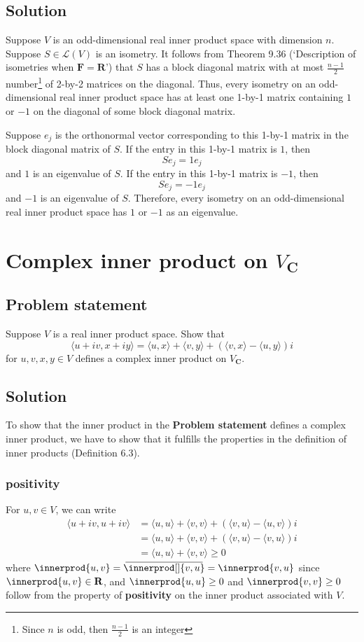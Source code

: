 \documentclass{article}
\DeclarePairedDelimiter{\innerprod}\langle\rangle
\newcommand\conjinnerp[2][]{\:\overline{\mkern-4mu\innerprod[#1]{#2}\mkern-4mu}\:}
\begin{document}
\subsection*{Solution}
Suppose $V$ is an odd-dimensional real inner product space with dimension $n$. 
Suppose $S\in\mathcal{L}(V)$ is an isometry. 
It follows from Theorem 9.36 (`Description of isometries when $\mathbf{F}=\mathbf{R}$') that $S$ has a block diagonal matrix with at most $\frac{n-1}{2}$ number\footnote{
Since $n$ is odd, then $\frac{n-1}{2}$ is an integer
} of 2-by-2 matrices on the diagonal. 
Thus, every isometry on an odd-dimensional real inner product space has at least one 1-by-1 matrix containing $1$ or $-1$ on the diagonal of some block diagonal matrix. 

Suppose $e_j$ is the orthonormal vector corresponding to this 1-by-1 matrix in the block diagonal matrix of $S$. 
If the entry in this 1-by-1 matrix is $1$, then 
\[Se_j=1e_j\]
and $1$ is an eigenvalue of $S$. 
If the entry in this 1-by-1 matrix is $-1$, then
\[Se_j=-1e_j\]
and $-1$ is an eigenvalue of $S$. 
Therefore, every isometry on an odd-dimensional real inner product space has $1$ or $-1$ as an eigenvalue.

\clearpage

\section{Complex inner product on $V_{\mathbf{C}}$}
\subsection*{Problem statement}
Suppose $V$ is a real inner product space. 
Show that 
\[\langle u+iv,x+iy\rangle=\langle u,x\rangle +\langle v,y\rangle + (\langle v,x\rangle - \langle u,y\rangle)i\]
for $u,v,x,y\in V$ defines a complex inner product on $V_{\mathbf{C}}$.

\subsection*{Solution}
To show that the inner product in the \textbf{Problem statement} defines a complex inner product, we have to show that it fulfills the properties in the definition of inner products (Definition 6.3).

\subsubsection*{positivity}
For $u,v\in V$, we can write
\begin{align*}
    \langle u+iv,u+iv\rangle&=\langle u,u\rangle +\langle v,v\rangle + (\langle v,u\rangle - \langle u,v\rangle)i\\
    &=\langle u,u\rangle +\langle v,v\rangle + (\langle v,u\rangle - \langle v,u\rangle)i\\
    &=\langle u,u\rangle +\langle v,v\rangle \geq 0
\end{align*}
where $\innerprod{u,v}=\conjinnerp{v,u}=\innerprod{v,u}$ since $\innerprod{u,v}\in\mathbf{R}$, and $\innerprod{u,u}\geq0$ and $\innerprod{v,v}\geq0$ follow from the property of \textbf{positivity} on the inner product associated with $V$.
\end{document}
